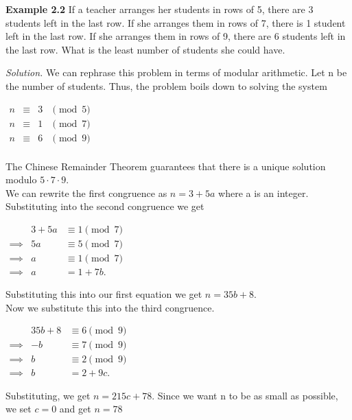 \documentclass{article}
\begin{document}
\begin{mdframed}
    \textbf{Example 2.2} 
    If a teacher arranges her students in rows of 5, there are 3 students left in the last row.
    If she arranges them in rows of 7, there is 1 student left in the last row. If she arranges them in rows of 9, 
    there are 6 students left in the last row. What is the least number of students she could have.
\end{mdframed}
\emph{Solution.} We can rephrase this problem in terms of modular arithmetic. Let n be the number of students. Thus, the problem boils down to solving the system
    \begin{center}
        $\begin{array}{rcll}
            n &\equiv &3 &\pmod{5}\\
            n &\equiv &1 &\pmod{7}\\
            n &\equiv &6 &\pmod{9}\\
        \end{array}$
    \end{center}
    The Chinese Remainder Theorem guarantees that there is a unique solution modulo $5\cdot 7 \cdot 9$.\\
    We can rewrite the first congruence as $n = 3 + 5a$ where a is an integer.
    Substituting into the second congruence we get 
    \begin{center}
        $\begin{array}{rrll}
            &3+5a &\equiv 1 \pmod{7} \\
         \implies &5a &\equiv 5 \pmod{7} \\
         \implies &a &\equiv 1 \pmod{7}\\
         \implies &a &= 1 + 7b.
        \end{array}$
    \end{center}
    Substituting this into our first equation we get $n = 35b + 8$. \\
    Now we substitute this into the third congruence.
    \begin{center}
        $\begin{array}{rrll}
            &35b+8 &\equiv 6 \pmod{9} \\
         \implies &-b &\equiv 7 \pmod{9} \\
         \implies &b &\equiv 2 \pmod{9}\\
         \implies &b &= 2 + 9c.
        \end{array}$
    \end{center}
    Substituting, we get $n = 215c + 78$. Since we want n to be as small as possible, we set $c=0$ and get $\boxed{n=78}$
\end{document}
